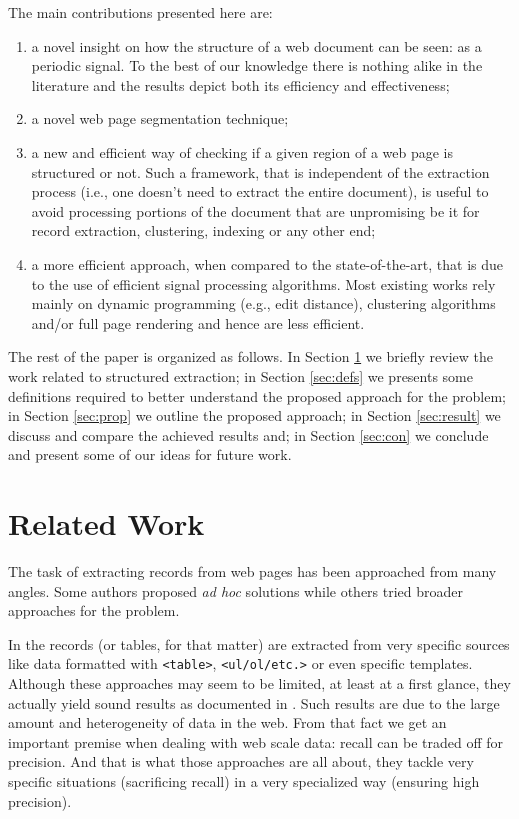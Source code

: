 \documentclass{vldb}
\begin{document}
The main contributions presented here are:
\begin{enumerate}
    \item a novel insight on how the structure of a web document can be seen: as
    a periodic signal. To the best of our knowledge there is nothing alike in
    the literature and the results depict both its efficiency and effectiveness;
    \item a novel web page segmentation technique;
    \item a new and efficient way of checking if a given region of a web page is
    structured or not. Such a framework, that is independent of the extraction
    process (i.e., one doesn't need to extract the entire document), is useful
    to avoid processing portions of the document that are unpromising be it for
    record extraction, clustering, indexing or any other end;
    \item a more efficient approach, when compared to the state-of-the-art,
    that is due to the use of efficient signal processing algorithms. Most
    existing works rely mainly on dynamic programming (e.g., edit distance), clustering
    algorithms and/or full page rendering and hence are less efficient.
\end{enumerate}

The rest of the paper is organized as follows. In Section \ref{sec:work} we
briefly review the work related to structured extraction; in Section
\ref{sec:defs} we presents some definitions required to better understand the
proposed approach for the problem; in Section \ref{sec:prop} we outline the
proposed approach; in Section \ref{sec:result} we discuss and compare the
achieved results and; in Section \ref{sec:con} we conclude and present some
of our ideas for future work.

\section{Related Work}\label{sec:work}

The task of extracting records from web pages has been approached from many
angles. Some authors proposed \textit{ad hoc} solutions while others tried 
broader approaches for the problem.

In \cite{webtables2008, listExtract2009, tablesMS2012, tegra2015, qiu2015dexter,
topklists2013} the records (or tables, for that matter) are extracted from very
specific sources like data formatted with \texttt{<table>},
\texttt{<ul/ol/etc.>} or even specific templates. Although these approaches may
seem to be limited, at least at a first glance, they actually yield sound
results as documented in \cite{relationalWeb2008, probase, probase2012, acsdb}.
Such results are due to the large amount and heterogeneity of data in the web.
From that fact we get an important premise when dealing with web scale data:
recall can be traded off for precision. And that is what those approaches are
all about, they tackle very specific situations (sacrificing recall) in a very
specialized way (ensuring high precision).
\end{document}
